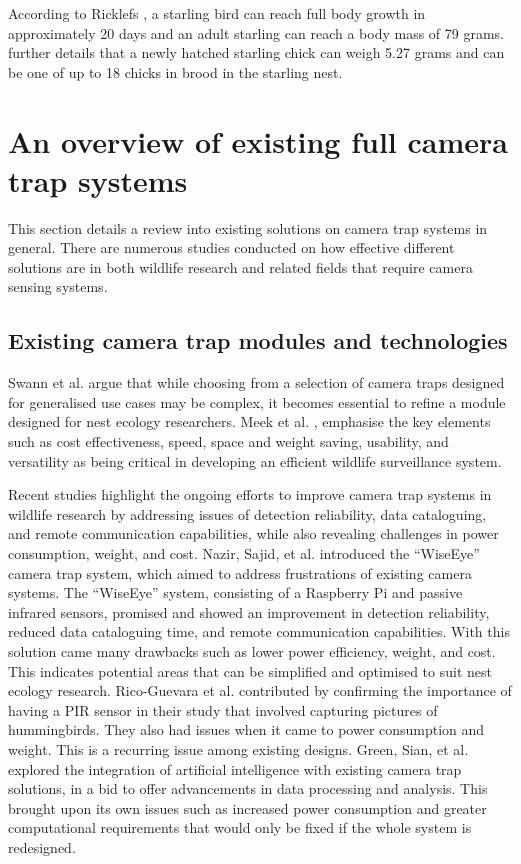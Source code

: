 \documentclass[class=report,11pt,crop=false]{standalone}
\begin{document}
According to Ricklefs \cite{ricklefs1968patterns}, a starling bird can reach full body growth in approximately 20 days and an adult starling can reach a body mass of 79 grams. \cite{ricklefs1968patterns} further details that a newly hatched starling chick can weigh 5.27 grams and can be one of up to 18 chicks in brood in the starling nest. 



\section{An overview of existing full camera trap systems}
This section details a review into existing solutions on camera trap systems in general. There are numerous studies conducted on how effective different solutions are in both wildlife research and related fields that require camera sensing systems. 


\subsection{Existing camera trap modules and technologies}
Swann et al. \cite{swann2011evaluating} argue that while choosing from a selection of camera traps designed for generalised use cases may be complex, it becomes essential to refine a module designed for nest ecology researchers. Meek et al. \cite{meek2012user}, emphasise the key elements such as cost effectiveness, speed, space and weight saving, usability, and versatility as being critical in developing an efficient wildlife surveillance system.  

Recent studies highlight the ongoing efforts to improve camera trap systems in wildlife research by addressing issues of detection reliability, data cataloguing, and remote communication capabilities, while also revealing challenges in power consumption, weight, and cost. Nazir, Sajid, et al. \cite{nazir2017wiseeye} introduced the “WiseEye” camera trap system, which aimed to address frustrations of existing camera systems. The “WiseEye” system, consisting of a Raspberry Pi and passive infrared sensors, promised and showed an improvement in detection reliability, reduced data cataloguing time, and remote communication capabilities. With this solution came many drawbacks such as lower power efficiency, weight, and cost. This indicates potential areas that can be simplified and optimised to suit nest ecology research. Rico-Guevara et al. \cite{rico-guevara2017bring} contributed by confirming the importance of having a PIR sensor in their study that involved capturing pictures of hummingbirds. They also had issues when it came to power consumption and weight. This is a recurring issue among existing designs. Green, Sian, et al. \cite{green2020innovations} explored the integration of artificial intelligence with existing camera trap solutions, in a bid to offer advancements in data processing and analysis. This brought upon its own issues such as increased power consumption and greater computational requirements that would only be fixed if the whole system is redesigned. 
\end{document}
